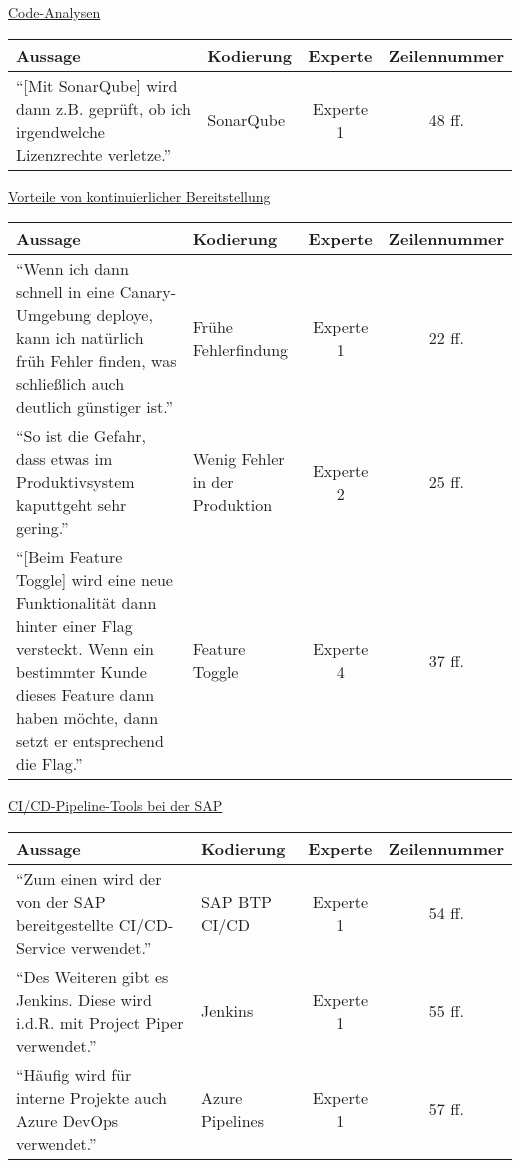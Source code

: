     \underline{Code-Analysen}\\
\begin{longtable}{ |C{6cm}|C{3cm}|c|c| }
    \hline
    Aussage & Kodierung & Experte & Zeilennummer\\
    \hline
    \enquote{[Mit SonarQube] wird dann z.B. geprüft, ob ich irgendwelche Lizenzrechte verletze.} & SonarQube & Experte 1 & 48 ff. \\
    \hline
    \end{longtable}

    \underline{Vorteile von kontinuierlicher Bereitstellung}\\
    \begin{longtable}{ |C{6cm}|C{3cm}|c|c| }
        \hline
        Aussage & Kodierung & Experte & Zeilennummer\\
        \hline
        \enquote{Wenn ich dann schnell in eine Canary-Umgebung deploye, kann ich natürlich früh Fehler finden, was schließlich auch deutlich günstiger ist.} & Frühe Fehlerfindung & Experte 1 & 22 ff. \\
        \hline
        \enquote{So ist die Gefahr, dass etwas im Produktivsystem kaputtgeht sehr gering.} & Wenig Fehler in der Produktion & Experte 2 & 25 ff. \\
        \hline
        \enquote{[Beim Feature Toggle] wird eine neue Funktionalität dann hinter einer Flag versteckt. Wenn ein bestimmter Kunde dieses Feature dann haben möchte, dann setzt er entsprechend die Flag.} & Feature Toggle & Experte 4 & 37 ff. \\
        \hline
        \end{longtable}




    \underline{CI/CD-Pipeline-Tools bei der SAP}\\
\begin{longtable}{ |C{6cm}|C{3cm}|c|c| }
    \hline
    Aussage & Kodierung & Experte & Zeilennummer\\
    \hline
    \enquote{Zum einen wird der von der SAP bereitgestellte CI/CD-Service verwendet.} & SAP BTP CI/CD & Experte 1 & 54 ff. \\
    \hline
    \enquote{Des Weiteren gibt es Jenkins. Diese wird i.d.R. mit Project Piper verwendet.} & Jenkins & Experte 1 & 55 ff. \\
    \hline
    \enquote{Häufig wird für interne Projekte auch Azure DevOps verwendet.} & Azure Pipelines & Experte 1 & 57 ff. \\
    \hline
    \end{longtable}

